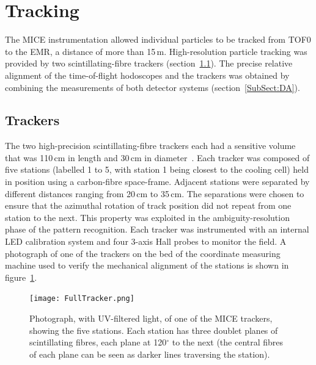

\section{Tracking}
\label{Sect:Tracking}

The MICE instrumentation allowed individual particles to be tracked from TOF0 to
the EMR, a distance of more than 15\,m.
High-resolution particle tracking was provided by two
scintillating-fibre trackers (section~\ref{SubSect:Tracker}).
The precise relative alignment of the time-of-flight hodoscopes and
the trackers was obtained by combining the measurements of both
detector systems (section~\ref{SubSect:DA}). 

\graphicspath{{06-Tracking/Figures/}}

\subsection{Trackers}
\label{SubSect:Tracker}

The two high-precision scintillating-fibre trackers each had a
sensitive volume that was 110\,cm in length and 30\,cm in
diameter~\cite{Ellis:2010bb}.
Each tracker was composed of five stations (labelled 1 to 5, with
station 1 being closest to the cooling cell) held in position using a
carbon-fibre space-frame.  
Adjacent stations were separated by different distances ranging from
20\,cm to 35\,cm.
The separations were chosen to ensure that the azimuthal rotation of
track position did not repeat from one station to the next.
This property was exploited in the ambiguity-resolution phase of the
pattern recognition.
Each tracker was instrumented with an internal LED calibration system
and four 3-axis Hall probes to monitor the field.
A photograph of one of the trackers on the bed of the coordinate
measuring machine used to verify the mechanical alignment of the
stations is shown in figure~\ref{Figure:FullTracker}.
\begin{figure}
  \begin{center}
    \texttt{[image: FullTracker.png]}
  \end{center}
  \caption{
    Photograph, with UV-filtered light, of one of the MICE trackers, showing the five stations.
    Each station has three doublet planes of scintillating fibres, each plane
    at 120$^\circ$ to the next (the central fibres of each plane can
    be seen as darker lines traversing the station).
  }
  \label{Figure:FullTracker}
\end{figure}

